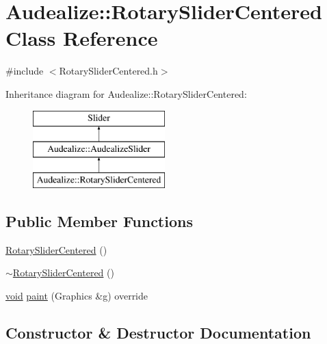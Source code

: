 \hypertarget{class_audealize_1_1_rotary_slider_centered}{}\section{Audealize\+:\+:Rotary\+Slider\+Centered Class Reference}
\label{class_audealize_1_1_rotary_slider_centered}


{\ttfamily \#include $<$Rotary\+Slider\+Centered.\+h$>$}

Inheritance diagram for Audealize\+:\+:Rotary\+Slider\+Centered\+:\begin{figure}[H]
\begin{center}
\leavevmode
\includegraphics[height=3.000000cm]{class_audealize_1_1_rotary_slider_centered}
\end{center}
\end{figure}
\subsection*{Public Member Functions}
\begin{DoxyCompactItemize}
\item 
\hyperlink{class_audealize_1_1_rotary_slider_centered_a72f81f0092f3470e912818a4461f0278}{Rotary\+Slider\+Centered} ()
\item 
\hyperlink{class_audealize_1_1_rotary_slider_centered_a88e45289d12a91580c9ffb7e5943b4e0}{$\sim$\+Rotary\+Slider\+Centered} ()
\item 
\hyperlink{tk_8h_aba408b7cd755a96426e004c015f5de8e}{void} \hyperlink{class_audealize_1_1_rotary_slider_centered_afca4e8db6f0eb641e945514f46cc8ca7}{paint} (Graphics \&g) override
\end{DoxyCompactItemize}


\subsection{Constructor \& Destructor Documentation}
